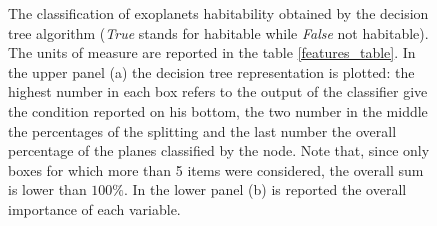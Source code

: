 \documentclass[
12pt, %
a4paper, %
oneside, %
headinclude,footinclude, %
BCOR5mm, %
]{scrartcl}
\begin{document}
\begin{figure}[h]
 \centering
\begin{center}
\caption{The classification of exoplanets habitability obtained by the decision tree algorithm (\textit{True} stands for habitable while \textit{False} not habitable). The units of measure are reported in the table \ref{features_table}. In the  upper panel (a) the decision tree representation is plotted: the highest number in each box refers to the output of the classifier give the condition reported on his bottom, the two number in the middle the percentages of the splitting and the last number the overall percentage of the planes classified by the node. Note that, since only boxes for which more than 5 items were considered, the overall sum is lower than $100 \%$. In the lower panel (b) is reported the overall importance of each variable.}
\label{DecisionTree}
\end{center}
\end{figure}
\end{document}
